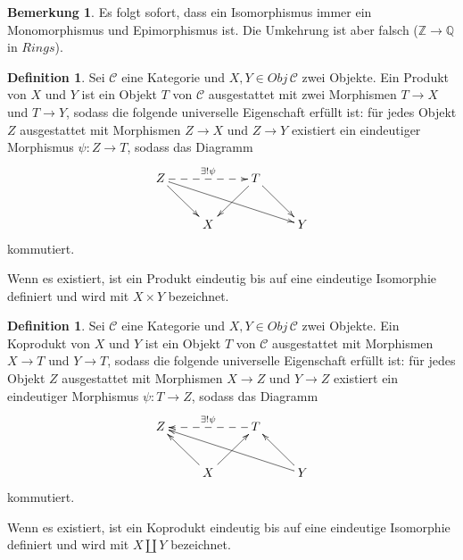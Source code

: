 \documentclass[reqno,12pt]{article}
\numberwithin{equation}{section}
\newcommand{\bQ}{\mathbb{Q}}
\newcommand{\bZ}{\mathbb{Z}}
\newcommand{\cC}{\mathcal{C}}
\theoremstyle{plain}
\theoremstyle{definition}
\newtheorem{definition}[thm]{Definition}
\newtheorem{remark}[thm]{Bemerkung}
\begin{document}
\begin{remark}
Es folgt sofort, dass ein Isomorphismus immer ein Monomorphismus und Epimorphismus ist. Die Umkehrung ist aber falsch ($\bZ \to \bQ$ in $Rings$).
\end{remark}

\begin{definition}
Sei $\cC$ eine Kategorie und $X,Y \in Obj \, \cC$ zwei Objekte. Ein {\sf Produkt} von $X$ und $Y$ ist ein Objekt $T$ von $\cC$ ausgestattet mit zwei Morphismen $T \to X$ und $T \to Y$, sodass die folgende universelle Eigenschaft erfüllt ist: für jedes Objekt $Z$ ausgestattet mit Morphismen $Z \to X$ und $Z \to Y$ existiert ein eindeutiger Morphismus $\psi \colon Z \to T$, sodass das Diagramm
\begin{align*}
  \xymatrix{
   Z \ar@{-->}[rr]^{\exists ! \psi } \ar[dr] \ar[drrr] &&   T \ar[dl] \ar[dr]\\
   & X & & Y
  }
\end{align*}
kommutiert.

Wenn es existiert, ist ein Produkt eindeutig bis auf eine eindeutige Isomorphie definiert und wird mit $X \times Y$ bezeichnet.
\end{definition}



\begin{definition}
Sei $\cC$ eine Kategorie und $X,Y \in Obj \, \cC$ zwei Objekte. Ein {\sf Koprodukt} von $X$ und $Y$ ist ein Objekt $T$ von $\cC$ ausgestattet mit Morphismen $X \to T$ und $Y \to T$, sodass die folgende universelle Eigenschaft erfüllt ist: für jedes Objekt $Z$ ausgestattet mit Morphismen $X \to Z$ und $Y \to Z$ existiert ein eindeutiger Morphismus $\psi \colon T \to Z$, sodass das Diagramm
\begin{align*}
  \xymatrix{
   Z   &&   T  \ar@{-->}[ll]_{\exists ! \psi }  \\
   & X \ar[lu] \ar[ur] & & Y \ar[ulll] \ar[ul]
  }
\end{align*}
kommutiert.

Wenn es existiert, ist ein Koprodukt eindeutig bis auf eine eindeutige Isomorphie definiert und wird mit $X \coprod Y$ bezeichnet.
\end{definition}
\end{document}
